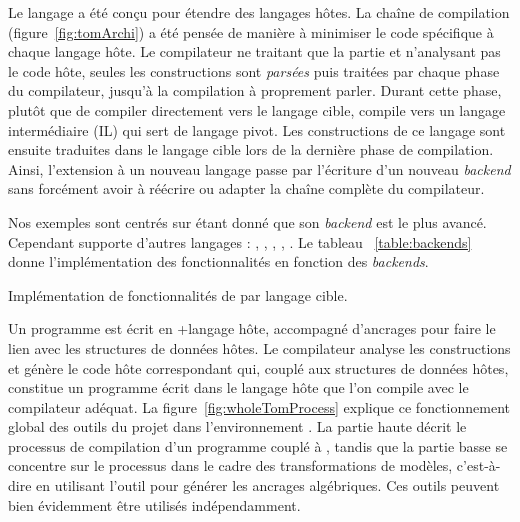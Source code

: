 Le langage {\tom} a été conçu pour étendre des langages hôtes. La chaîne de
compilation (figure~\ref{fig:tomArchi}) a été pensée de manière à minimiser le
code spécifique à chaque langage hôte. Le compilateur ne traitant que la partie
{\tom} et n'analysant pas le code hôte, seules les constructions {\tom} sont
\emph{parsées} puis traitées par chaque phase du compilateur, jusqu'à la
compilation à proprement parler. Durant cette phase, plutôt que de compiler
directement vers le langage cible, {\tom} compile vers un langage intermédiaire
(IL) qui sert de langage pivot. Les constructions de ce langage sont ensuite
traduites dans le langage cible lors de la dernière phase de compilation.
Ainsi, l'extension à un nouveau langage passe par l'écriture d'un nouveau
\emph{backend} sans forcément avoir à réécrire ou adapter la chaîne complète du
compilateur.

Nos exemples sont centrés sur {\java} étant donné que son \emph{backend} est
le plus avancé. Cependant {\tom} supporte d'autres langages : {\ada}, {\C},
{\caml}, {\csharp}, {\python}. Le tableau ~\ref{table:backends} donne
l'implémentation des fonctionnalités en fonction des \emph{backends}.

\begin{table}[H]
  \begin{center}
    
  \end{center}
    \caption{Implémentation de fonctionnalités de {\tom} par langage cible.}
    \label{table:backends}
\end{table}


Un programme est écrit en {\tom}+langage hôte, accompagné d'ancrages pour faire
le lien avec les structures de données hôtes. Le compilateur analyse les
constructions {\tom} et génère le code hôte correspondant qui, couplé aux
structures de données hôtes, constitue un programme écrit dans le langage hôte
que l'on compile avec le compilateur adéquat. La
figure~\ref{fig:wholeTomProcess}
explique ce fonctionnement global des outils du projet {\tom} dans
l'environnement {\java}. La partie haute décrit le processus de compilation
d'un programme {\tom} couplé à {\gom}, tandis que la partie basse se concentre
sur le processus dans le cadre des transformations de modèles, c'est-à-dire en
utilisant l'outil {\tomemf} pour générer les ancrages algébriques. Ces outils
peuvent bien évidemment être utilisés indépendamment.

